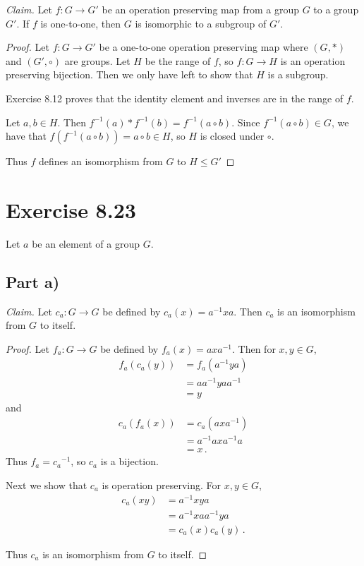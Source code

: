 \documentclass{abrice}
\newcommand{\Claim}{\noindent\emph{Claim.}\xspace}%
\begin{document}
\Claim Let $f : G \to G'$ be an operation preserving map from a group $G$ to a
group $G'$. If $f$ is one-to-one, then $G$ is isomorphic to a subgroup of
$G'$.

\begin{proof}
  Let $f : G \to G'$ be a one-to-one operation preserving map where $(G,*)$ and
  $(G', \circ)$ are groups. Let $H$ be the range of $f$, so $f : G \to H$ is an
  operation preserving bijection. Then we only have left to show that $H$ is a
  subgroup.

  Exercise 8.12 proves that the identity element and inverses are in the range
  of $f$.

  Let $a,b \in H$. Then $f^{-1}(a) * f^{-1}(b) = f^{-1}(a \circ b)$. Since
  $f^{-1}(a \circ b) \in G$, we have that $f(f^{-1}(a \circ b)) = a \circ b \in
  H$, so $H$ is closed under $\circ$.

  Thus $f$ defines an isomorphism from $G$ to $H \leq G'$
\end{proof}

\section{Exercise 8.23}

Let $a$ be an element of a group $G$.

\subsection{Part a)}

\Claim Let $c_a : G \to G$ be defined by $c_a(x) = a^{-1} x a$. Then $c_a$ is an
isomorphism from $G$ to itself.

\begin{proof}
  Let $f_a : G \to G$ be defined by $f_a(x) = a x a^{-1}$. Then for $x,y \in G$,
  \begin{align*}
    f_a(c_a(y))
    &= f_a(a^{-1} y a) \\
    &= a a^{-1} y a a^{-1} \\
    &= y
  \end{align*}
  and
  \begin{align*}
    c_a(f_a(x))
    &= c_a(a x a^{-1}) \\
    &= a^{-1} a x a^{-1} a \\
    &= x\, .
  \end{align*}
  Thus $f_a = {c_a}^{-1}$, so $c_a$ is a bijection.

  Next we show that $c_a$ is operation preserving. For $x,y \in G$,
  \begin{align*}
    c_a(xy)
    &= a^{-1} x y a \\
    &= a^{-1} x a a^{-1} y a \\
    &= c_a(x) c_a(y)\, .
  \end{align*}

  Thus $c_a$ is an isomorphism from $G$ to itself.
\end{proof}
\end{document}
